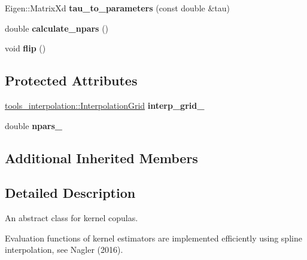 \begin{DoxyCompactItemize}
\item 
\hypertarget{classvinecopulib_1_1_kernel_bicop_a510489f8f985c04c4f692e12ab2d1bf0}{Eigen\+::\+Matrix\+Xd {\bfseries tau\+\_\+to\+\_\+parameters} (const double \&tau)}\label{classvinecopulib_1_1_kernel_bicop_a510489f8f985c04c4f692e12ab2d1bf0}

\item 
\hypertarget{classvinecopulib_1_1_kernel_bicop_a33f736d5f443399f1f4dbe54b386aba3}{double {\bfseries calculate\+\_\+npars} ()}\label{classvinecopulib_1_1_kernel_bicop_a33f736d5f443399f1f4dbe54b386aba3}

\item 
\hypertarget{classvinecopulib_1_1_kernel_bicop_abc23a81271f970b9c99dd6ed727c170f}{void {\bfseries flip} ()}\label{classvinecopulib_1_1_kernel_bicop_abc23a81271f970b9c99dd6ed727c170f}

\end{DoxyCompactItemize}
\subsection*{Protected Attributes}
\begin{DoxyCompactItemize}
\item 
\hypertarget{classvinecopulib_1_1_kernel_bicop_ae3499afa748f324e0f7fbb596a5c8628}{\hyperlink{classvinecopulib_1_1tools__interpolation_1_1_interpolation_grid}{tools\+\_\+interpolation\+::\+Interpolation\+Grid} {\bfseries interp\+\_\+grid\+\_\+}}\label{classvinecopulib_1_1_kernel_bicop_ae3499afa748f324e0f7fbb596a5c8628}

\item 
\hypertarget{classvinecopulib_1_1_kernel_bicop_a1b49a0a2630e71079c08ebdca79b06b6}{double {\bfseries npars\+\_\+}}\label{classvinecopulib_1_1_kernel_bicop_a1b49a0a2630e71079c08ebdca79b06b6}

\end{DoxyCompactItemize}
\subsection*{Additional Inherited Members}


\subsection{Detailed Description}
An abstract class for kernel copulas. 

Evaluation functions of kernel estimators are implemented efficiently using spline interpolation, see Nagler (2016).

